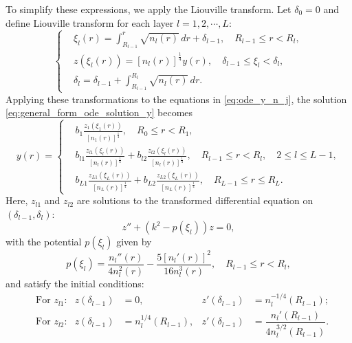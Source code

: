 \documentclass[11pt,reqno]{amsart}
\theoremstyle{definition}
\theoremstyle{remark}
\numberwithin{equation}{section}
\begin{document}
To simplify these expressions, we apply the Liouville transform. Let $\delta_0 = 0$ and define Liouville transform for each layer $l=1,2,\cdots,L$:
\begin{equation}\label{eq:Liouville transform}
	\left\{
	\begin{aligned}
		&\xi_l(r) = \int_{R_{l-1}}^r \sqrt{n_l(r)}\,dr+\delta_{l-1} , \quad R_{l-1} \leq r < R_l,\\
		&z(\xi_l(r)) = [n_l(r)]^{\frac{1}{4}} y(r), \quad \delta_{l-1} \leq \xi_l < \delta_l,\\
		&\delta_l = \delta_{l-1} + \int_{R_{l-1}}^{R_l} \sqrt{n_l(r)} \, dr.
	\end{aligned}
	\right.
\end{equation}
Applying these transformations to the equations in \eqref{eq:ode_y_n_j}, the solution \eqref{eq:general_form_ode_solution_y} becomes
\begin{equation}\label{eq:original_ode_solution_y}
	y(r) =
	\left\{
	\begin{aligned}
		&b_1 \frac{z_1(\xi_1(r))}{[n_{1}(r)]^{\frac{1}{4}}}, \quad R_0 \leq r< R_1, \\
		&b_{l1} \frac{z_{l1}(\xi_l(r))}{[n_l(r)]^{\frac{1}{4}}} +b_{l2}\frac{z_{l2}(\xi_l(r))}{[n_l(r)]^{\frac{1}{4}}},  \quad R_{l-1} \leq r<R_l, \quad 2 \leq l \leq L-1, \\
		&b_{L1} \frac{z_{L1}(\xi_L(r))}{[n_L(r)]^{\frac{1}{4}}} +b_{L2}\frac{z_{L2}(\xi_L(r))}{[n_L(r)]^{\frac{1}{4}}},  \quad R_{L-1} \leq r \leq R_L.
	\end{aligned}
	\right.
\end{equation}
Here, $z_{l1}$ and $z_{l2}$ are solutions to the transformed differential equation on $(\delta_{l-1}, \delta_l)$:
\begin{equation*}\label{eq:basis_for_z_j}
	z'' + \left(k^2 - p(\xi_l)\right) z = 0,
\end{equation*}
with the potential $p(\xi_l)$ given by
\begin{equation*}
p(\xi_l) = \frac{n_l''(r)}{4n_l^2(r)} - \frac{5[n_l'(r)]^2}{16n_l^3(r)}, \quad R_{l-1} \leq r<R_l,
\end{equation*}
and satisfy the initial conditions:
\begin{align*}
	&\text{For $z_{l1}$:} & z(\delta_{l-1}) &= 0, & z'(\delta_{l-1}) &= n_l^{-1/4}(R_{l-1}); \\
	&\text{For $z_{l2}$:} & z(\delta_{l-1}) &= n_l^{1/4}(R_{l-1}), & z'(\delta_{l-1}) &= \dfrac{n_l'(R_{l-1})}{4n_l^{3/2}(R_{l-1})}.
\end{align*}
\end{document}
